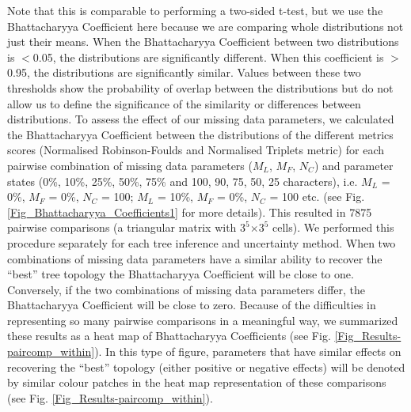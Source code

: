 Note that this is comparable to performing a two-sided t-test, but we use the Bhattacharyya Coefficient here because we are comparing whole distributions not just their means.
When the Bhattacharyya Coefficient between two distributions is $<$0.05, the distributions are significantly different.
When this coefficient is $>$0.95, the distributions are significantly similar.
Values between these two thresholds show the probability of overlap between the distributions but do not allow us to define the significance of the similarity or differences between distributions.
To assess the effect of our missing data parameters, we calculated the Bhattacharyya Coefficient between the distributions of the different metrics scores (Normalised Robinson-Foulds and Normalised Triplets metric) for each pairwise combination of missing data parameters ($M_{L}$, $M_{F}$, $N_{C}$) and parameter states (0\%, 10\%, 25\%, 50\%, 75\% and 100, 90, 75, 50, 25 characters), i.e. $M_{L}$ = 0\%, $M_{F}$ = 0\%, $N_{C}$ = 100; $M_{L}$ = 10\%, $M_{F}$ = 0\%, $N_{C}$ = 100 etc. (see Fig. \ref{Fig_Bhattacharyya_Coefficients1} for more details).
This resulted in 7875 pairwise comparisons (a triangular matrix with $3^5$$\times$$3^5$ cells).
We performed this procedure separately for each tree inference and uncertainty method.
When two combinations of missing data parameters have a similar ability to recover the ``best'' tree topology the Bhattacharyya Coefficient will be close to one.
Conversely, if the two combinations of missing data parameters differ, the Bhattacharyya Coefficient will be close to zero.
Because of the difficulties in representing so many pairwise comparisons in a meaningful way, we summarized these results as a heat map of Bhattacharyya Coefficients (see Fig. \ref{Fig_Results-paircomp_within}).
In this type of figure, parameters that have similar effects on recovering the ``best'' topology (either positive or negative effects) will be denoted by similar colour patches in the heat map representation of these comparisons (see Fig. \ref{Fig_Results-paircomp_within}).


